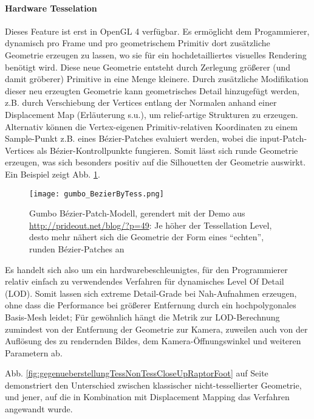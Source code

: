 	\paragraph{Hardware Tesselation}
	Dieses Feature ist erst in OpenGL 4 verfügbar. Es ermöglicht dem Progammierer, dynamisch pro Frame
	und pro geometrischem Primitiv dort zusätzliche Geometrie erzeugen zu lassen, wo sie für ein hochdetailliertes 
	visuelles Rendering benötigt wird. Diese neue Geometrie entsteht durch Zerlegung größerer (und damit gröberer)
	Primitive in eine Menge kleinere. Durch zusätzliche Modifikation dieser neu erzeugten Geometrie kann
	geometrisches Detail hinzugefügt werden, z.B. durch Verschiebung der Vertices entlang der Normalen anhand einer
	Displacement Map (Erläuterung s.u.), um relief-artige Strukturen zu erzeugen. 
	Alternativ können die Vertex-eigenen Primitiv-relativen Koordinaten zu einem Sample-Punkt z.B. eines 
	Bézier-Patches evaluiert werden, wobei die input-Patch-Vertices als Bézier-Kontrollpunkte fungieren.
	Somit lässt sich runde Geometrie erzeugen, was sich besonders positiv auf die Silhouetten der Geometrie auswirkt.
	Ein Beispiel zeigt Abb. \ref{fig:bezierByTess}. \\
	
	\begin{figure}[!h]
		\texttt{[image: gumbo\_BezierByTess.png]}
		\caption{Gumbo Bézier-Patch-Modell,	gerendert mit der Demo aus
			\url{http://prideout.net/blog/?p=49}: Je höher der Tessellation Level, desto mehr nähert
			sich die Geometrie der Form eines "`echten"', runden Bézier-Patches an}
		\label{fig:bezierByTess}
	\end{figure}
	
	Es handelt sich also um ein hardwarebeschleunigtes, für den Programmierer relativ einfach zu verwendendes
	Verfahren für dynamisches Level Of Detail (LOD). Somit lassen sich extreme Detail-Grade bei Nah-Aufnahmen
	erzeugen, ohne dass die Performance bei größerer Entfernung durch ein hochpolygonales Basis-Mesh leidet; 
	Für gewöhnlich hängt die Metrik zur LOD-Berechnung zumindest von der Entfernung der Geometrie zur Kamera,
	zuweilen auch von der Auflösung des zu rendernden Bildes, dem Kamera-Öffnungswinkel und weiteren Parametern ab.
	
	Abb. \ref{fig:gegenueberstellungTessNonTessCloseUpRaptorFoot} auf Seite 
	\pageref{fig:gegenueberstellungTessNonTessCloseUpRaptorFoot} demonstriert den Unterschied zwischen klassischer
	nicht-tessellierter Geometrie, und jener, auf die in Kombination mit Displacement Mapping das 
	Verfahren angewandt wurde.
	
